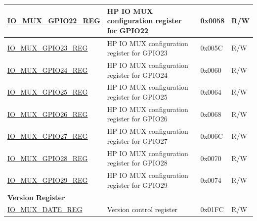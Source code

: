 \begin{longtable}{ | p{6cm} | p{7.2cm} | p{1.3cm} | p{1cm} | }
\hyperref[regdesc:IOMUXGPIONREG]{IO\_MUX\_GPIO22\_REG} & HP IO MUX configuration register for GPIO22 & 0x0058 & R/W \\ \hline
\hyperref[regdesc:IOMUXGPIONREG]{IO\_MUX\_GPIO23\_REG} & HP IO MUX configuration register for GPIO23 & 0x005C & R/W \\ \hline
\hyperref[regdesc:IOMUXGPIONREG]{IO\_MUX\_GPIO24\_REG} & HP IO MUX configuration register for GPIO24 & 0x0060 & R/W \\ \hline
\hyperref[regdesc:IOMUXGPIONREG]{IO\_MUX\_GPIO25\_REG} & HP IO MUX configuration register for GPIO25 & 0x0064 & R/W \\ \hline
\hyperref[regdesc:IOMUXGPIONREG]{IO\_MUX\_GPIO26\_REG} & HP IO MUX configuration register for GPIO26 & 0x0068 & R/W \\ \hline
\hyperref[regdesc:IOMUXGPIONREG]{IO\_MUX\_GPIO27\_REG} & HP IO MUX configuration register for GPIO27 & 0x006C & R/W \\ \hline
\hyperref[regdesc:IOMUXGPIONREG]{IO\_MUX\_GPIO28\_REG} & HP IO MUX configuration register for GPIO28 & 0x0070 & R/W \\ \hline
\hyperref[regdesc:IOMUXGPIONREG]{IO\_MUX\_GPIO29\_REG} & HP IO MUX configuration register for GPIO29 & 0x0074 & R/W \\ \hline
\multicolumn{4}{|l|}{\textbf{Version Register}} \\ \hline
\hyperref[regdesc:IOMUXDATEREG]{IO\_MUX\_DATE\_REG} & Version control register & 0x01FC & R/W \\ \hline
\end{longtable}
